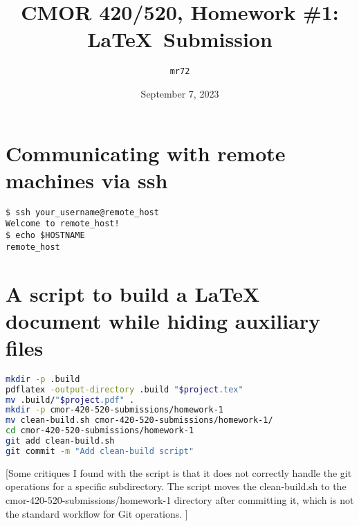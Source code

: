 \documentclass{article}
\title{CMOR 420/520, Homework \#1: LaTeX\ Submission}
\author{\texttt{mr72}}
\date{September 7, 2023}
\begin{document}
\maketitle

\section{Communicating with remote machines via ssh}

\begin{verbatim}
$ ssh your_username@remote_host
Welcome to remote_host!
$ echo $HOSTNAME
remote_host
\end{verbatim}

\section{A script to build a LaTeX document while hiding auxiliary files}

\begin{lstlisting}[language=bash, basicstyle=\ttfamily, caption={Script to compile LaTeX documents and manage auxiliary files.}]
mkdir -p .build
pdflatex -output-directory .build "$project.tex"
mv .build/"$project.pdf" .
mkdir -p cmor-420-520-submissions/homework-1
mv clean-build.sh cmor-420-520-submissions/homework-1/
cd cmor-420-520-submissions/homework-1
git add clean-build.sh
git commit -m "Add clean-build script"
\end{lstlisting}

[Some critiques I found with the script is that it does not correctly handle the git operations for a specific subdirectory. The script moves the clean-build.sh to the cmor-420-520-submissions/homework-1 directory after committing it, which is not the standard workflow for Git operations. ]
\end{document}
